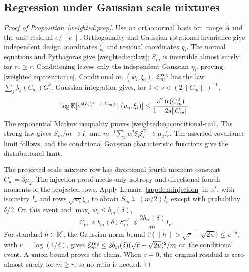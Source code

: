 \documentclass[11pt,a4paper]{article}
\theoremstyle{definition}\newtheorem{definition}[theorem]{Definition}
\theoremstyle{remark}\newtheorem{remark}[theorem]{Remark}
\numberwithin{equation}{section}
\newcommand{\R}{\mathbb R}\newcommand{\E}{\mathbb E}\newcommand{\Pp}{\mathbb P}
\newcommand{\norm}[1]{\lVert#1\rVert}\newcommand{\ip}[2]{\langle#1,#2\rangle}
\DeclareMathOperator{\tr}{tr}\DeclareMathOperator{\rank}{rank}
\DeclareMathOperator{\range}{range}\DeclareMathOperator{\diag}{diag}
\begin{document}
\subsection{Regression under Gaussian scale mixtures}\label{appendix:weighted}
\begin{proof}[Proof of Proposition~\ref{weighted:prop}]
Use an orthonormal basis for $\range A$ and the unit residual
$e/\norm e$. Orthogonality and Gaussian rotational invariance give
independent design coordinates $\xi_i$ and residual coordinates
$\eta_i$. The normal equations and Pythagoras give
\eqref{weighted:eq:law}; $S_m$ is invertible almost surely for $m\ge r$.
Conditioning leaves only the independent Gaussian $\eta_i$, proving
\eqref{weighted:eq:covariance}. Conditional on $(w_i,\xi_i)$,
$\mathcal E_m^{\rm reg}$ has the law $\sum_j\lambda_j(C_m)G_j^2$. Gaussian
integration gives, for $0<s<(2\norm{C_m})^{-1}$,
\[
 \log\E[e^{s(\mathcal E_m^{\rm reg}-\tr C_m)}\mid(w_i,\xi_i)]
 \le\frac{s^2\tr(C_m^2)}{1-2s\norm{C_m}}.
\]
The exponential Markov inequality proves
\eqref{weighted:eq:conditional-tail}. The strong law gives
$S_m/m\to I_r$ and
$m^{-1}\sum_iw_i^2\xi_i\xi_i^\top\to\mu_2I_r$.
The asserted covariance limit follows, and the conditional Gaussian
characteristic functions give the distributional limit.

The projected scale-mixture row has directional fourth-moment constant
$C_w=3\mu_2$. The injection proof needs only isotropy and directional
fourth moments of the projected rows. Apply Lemma~\ref{app:lem:injection}
in $\R^r$, with isometry $I_r$ and rows $\sqrt{w_i}\xi_i$, to obtain
$S_m\succeq(m/2)I_r$ except with probability $\delta/2$.
On this event and $\max_iw_i\le b_m(\delta)$,
\[
 C_m\preceq b_m(\delta)S_m^{-1}
       \preceq\frac{2b_m(\delta)}m I_r.
\]
For standard $h\in\R^r$, the Gaussian norm bound
$\Pp\{\norm h>\sqrt r+\sqrt{2u}\}\le e^{-u}$, with
$u=\log(4/\delta)$, gives $\mathcal E_m^{\rm reg}\le
2b_m(\delta)(\sqrt r+\sqrt{2u})^2/m$ on the conditional event.
A union bound proves the claim. When $e=0$, the original residual is
zero almost surely for $m\ge r$, so no ratio is needed.
\end{proof}
\end{document}
